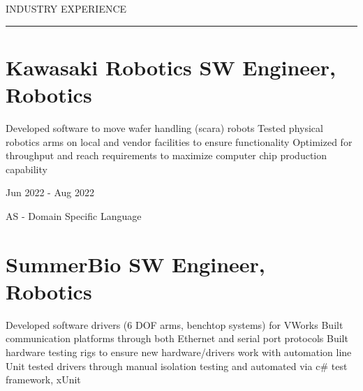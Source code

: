 
\vspace{1ex}
{\noindent\color{cblue} INDUSTRY EXPERIENCE }

\vspace{-6.5ex}
{\hspace{-1.73in}\noindent\color{dblue}\rule{6.935in}{0.4pt}} %
\vspace{-3.4ex}


\section
{\textbf{Kawasaki Robotics} \newline
SW Engineer, Robotics}{}

\vspace{-2.0ex}
\begin{detail}
    \BulletItem
    Developed software to move wafer handling (scara) robots 
    \BulletItem
    Tested physical robotics arms on local and vendor facilities to ensure functionality
    \BulletItem
    Optimized for throughput and reach requirements to maximize computer chip production capability
\end{detail}

\begin{subtitle}
    \vspace{-10.5ex}
    {{Jun 2022 - Aug 2022}}
\end{subtitle}

{\vspace{3ex} \color{cyan}\small {AS - Domain Specific Language}}
\vspace{1ex}


\section
{\textbf{SummerBio} \newline
SW Engineer, Robotics}{}

\vspace{-2.5ex}
\begin{detail}
    \BulletItem
    Developed software drivers (6 DOF arms, benchtop systems) for VWorks
    \BulletItem
    Built communication platforms through both Ethernet and serial port protocols
    \BulletItem
    Built hardware testing rigs to ensure new hardware/drivers work with automation line
    \BulletItem
    Unit tested drivers through manual isolation testing and automated via c\# test framework, xUnit
\end{detail}

